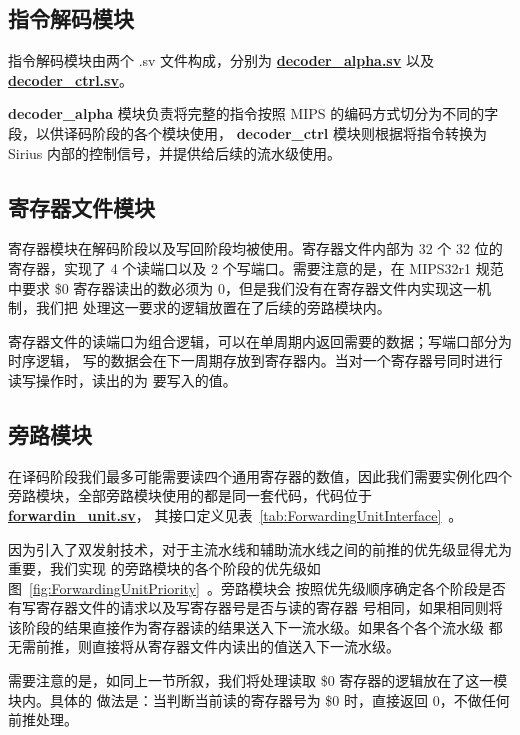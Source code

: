\documentclass[blue,normal,cn,hide]{elegantbook}
\begin{document}
\subsection{指令解码模块}

指令解码模块由两个 .sv 文件构成，分别为 \href{https://github.com/name1e5s/Sirius/blob/master/decoder\_alpha.sv}{\textbf{decoder\_alpha.sv}}
以及 \href{https://github.com/name1e5s/Sirius/blob/master/decoder\_ctrl.sv}{\textbf{decoder\_ctrl.sv}}。

\textbf{decoder\_alpha} 模块负责将完整的指令按照 MIPS 的编码方式切分为不同的字段，以供译码阶段的各个模块使用，
\textbf{decoder\_ctrl} 模块则根据将指令转换为 Sirius 内部的控制信号，并提供给后续的流水级使用。

\subsection{寄存器文件模块}

寄存器模块在解码阶段以及写回阶段均被使用。寄存器文件内部为 32 个 32 
位的寄存器，实现了 4 个读端口以及 2 个写端口。需要注意的是，在 MIPS32r1 规范中要求
\$0 寄存器读出的数必须为 0，但是我们没有在寄存器文件内实现这一机制，我们把
处理这一要求的逻辑放置在了后续的旁路模块内。

寄存器文件的读端口为组合逻辑，可以在单周期内返回需要的数据；写端口部分为时序逻辑，
写的数据会在下一周期存放到寄存器内。当对一个寄存器号同时进行读写操作时，读出的为
要写入的值。

\subsection{旁路模块}

在译码阶段我们最多可能需要读四个通用寄存器的数值，因此我们需要实例化四个
旁路模块，全部旁路模块使用的都是同一套代码，代码位于 \href{https://github.com/name1e5s/Sirius/blob/master/forwardin\_unit.sv}{\textbf{forwardin\_unit.sv}}，
其接口定义见表~\ref{tab:ForwardingUnitInterface}~。

因为引入了双发射技术，对于主流水线和辅助流水线之间的前推的优先级显得尤为重要，我们实现
的旁路模块的各个阶段的优先级如图~\ref{fig:ForwardingUnitPriority}~。旁路模块会
按照优先级顺序确定各个阶段是否有写寄存器文件的请求以及写寄存器号是否与读的寄存器
号相同，如果相同则将该阶段的结果直接作为寄存器读的结果送入下一流水级。如果各个各个流水级
都无需前推，则直接将从寄存器文件内读出的值送入下一流水级。

需要注意的是，如同上一节所叙，我们将处理读取 \$0 寄存器的逻辑放在了这一模块内。具体的
做法是：当判断当前读的寄存器号为 \$0 时，直接返回 0，不做任何前推处理。
\end{document}
